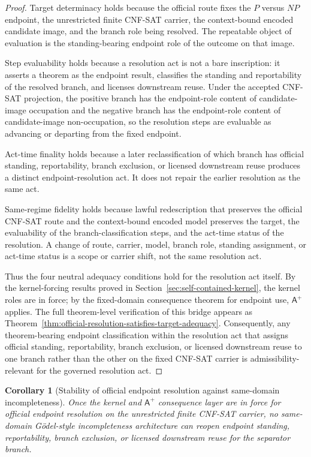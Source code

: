 \documentclass[11pt]{article}
\newtheorem{corollary}[theorem]{Corollary}
\theoremstyle{definition}
\theoremstyle{remark}
\newcommand{\Aplus}{\mathsf{A}^{+}}
\begin{document}
\begin{proof}
Target determinacy holds because the official route fixes the \(P\) versus \(NP\) endpoint, the unrestricted finite CNF-SAT carrier, the context-bound encoded candidate image, and the branch role being resolved. The repeatable object of evaluation is the standing-bearing endpoint role of the outcome on that image.

Step evaluability holds because a resolution act is not a bare inscription: it asserts a theorem as the endpoint result, classifies the standing and reportability of the resolved branch, and licenses downstream reuse. Under the accepted CNF-SAT projection, the positive branch has the endpoint-role content of candidate-image occupation and the negative branch has the endpoint-role content of candidate-image non-occupation, so the resolution steps are evaluable as advancing or departing from the fixed endpoint.

Act-time finality holds because a later reclassification of which branch has official standing, reportability, branch exclusion, or licensed downstream reuse produces a distinct endpoint-resolution act. It does not repair the earlier resolution as the same act.

Same-regime fidelity holds because lawful redescription that preserves the official CNF-SAT route and the context-bound encoded model preserves the target, the evaluability of the branch-classification steps, and the act-time status of the resolution. A change of route, carrier, model, branch role, standing assignment, or act-time status is a scope or carrier shift, not the same resolution act.

Thus the four neutral adequacy conditions hold for the resolution act itself. By the kernel-forcing results proved in Section~\ref{sec:self-contained-kernel}, the kernel roles are in force; by the fixed-domain consequence theorem for endpoint use, \(\Aplus\) applies. The full theorem-level verification of this bridge appears as Theorem~\ref{thm:official-resolution-satisfies-target-adequacy}. Consequently, any theorem-bearing endpoint classification within the resolution act that assigns official standing, reportability, branch exclusion, or licensed downstream reuse to one branch rather than the other on the fixed CNF-SAT carrier is admissibility-relevant for the governed resolution act.
\end{proof}

\begin{corollary}[Stability of official endpoint resolution against same-domain incompleteness]\label{cor:front-official-resolution-incompleteness-stability}
Once the kernel and \(\Aplus\) consequence layer are in force for official endpoint resolution on the unrestricted finite CNF-SAT carrier, no same-domain G\"odel-style incompleteness architecture can reopen endpoint standing, reportability, branch exclusion, or licensed downstream reuse for the separator branch.
\end{corollary}
\end{document}
